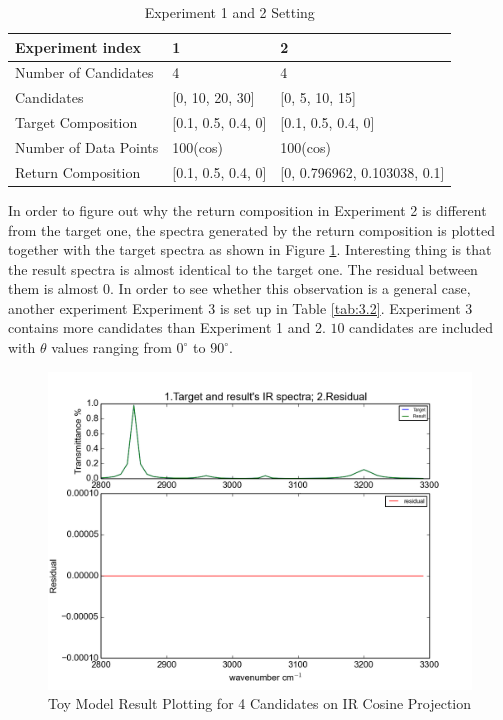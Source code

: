 \begin{table} \label{tab:3.1}
\begin{center}
\begin{tabular}{| l | l | l | }
\hline
Experiment index & 1 & 2  \\
\hline
Number of Candidates & 4 & 4  \\
\hline
Candidates & [0, 10, 20, 30] & [0, 5, 10, 15] \\
\hline
Target Composition & [0.1, 0.5, 0.4, 0] & [0.1, 0.5, 0.4, 0]     \\
\hline
Number of Data Points & 100(cos) &  100(cos)     \\
\hline
Return Composition & [0.1, 0.5, 0.4, 0] & [0, 0.796962, 0.103038, 0.1] \\
\hline
\end{tabular} 
\end{center}
\caption{Experiment 1 and 2 Setting}
\end{table}	

In order to figure out why the return composition in Experiment 2 is different from the target one, the spectra generated by the return composition is plotted together with the target spectra as shown in Figure \ref{fig:3.2}. Interesting thing is that the result spectra is almost identical to the target one. The residual between them is almost $0$. In order to see whether this observation is a general case, another experiment Experiment 3 is set up in Table \ref{tab:3.2}. Experiment 3 contains more candidates than Experiment 1 and 2. $10$ candidates are included with $\theta$ values ranging from $0^{\circ}$ to $90^{\circ}$.  \\

\begin{figure}[!ht] \label{fig:3.2}
\centering
\includegraphics[scale=0.7]{Figures/toy_model_result_plotting_ir_cos_4candi_1.png}
\caption{Toy Model Result Plotting for 4 Candidates on IR Cosine Projection}
\end{figure}

